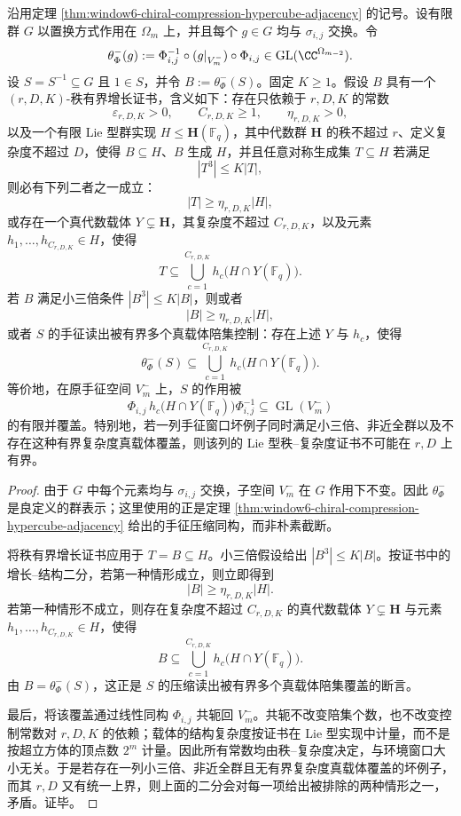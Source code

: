 \begin{theorem}[手征压缩窗口的秩有界坏例子分类门]\label{distill:breuillard_green_tao_approximate_groups_and_helfgott_growth-uniform_finite_to_geometric_transfer-chiral-compression-rank-bad-family-gate}
沿用定理 \ref{thm:window6-chiral-compression-hypercube-adjacency} 的记号。设有限群 \(G\) 以置换方式作用在 \(\Omega_m\) 上，并且每个 \(g\in G\) 均与 \(\sigma_{i,j}\) 交换。令
\[
\theta^-_{\Phi}(g):=\Phi_{i,j}^{-1}\circ (g|_{V_m^-})\circ \Phi_{i,j}
\in \operatorname{GL}(\CC^{\Omega_{m-2}}).
\]
设 \(S=S^{-1}\subseteq G\) 且 \(1\in S\)，并令 \(B:=\theta^-_{\Phi}(S)\)。固定 \(K\geq 1\)。假设 \(B\) 具有一个 \((r,D,K)\)-秩有界增长证书，含义如下：存在只依赖于 \(r,D,K\) 的常数
\[
\varepsilon_{r,D,K}>0,\qquad C_{r,D,K}\geq 1,\qquad \eta_{r,D,K}>0,
\]
以及一个有限 Lie 型群实现 \(H\leq \mathbf H(\mathbb F_q)\)，其中代数群 \(\mathbf H\) 的秩不超过 \(r\)、定义复杂度不超过 \(D\)，使得 \(B\subseteq H\)、\(B\) 生成 \(H\)，并且任意对称生成集 \(T\subseteq H\) 若满足
\[
|T^3|\leq K|T|,
\]
则必有下列二者之一成立：
\[
|T|\geq \eta_{r,D,K}|H|,
\]
或存在一个真代数载体 \(Y\subsetneq \mathbf H\)，其复杂度不超过 \(C_{r,D,K}\)，以及元素 \(h_1,\ldots,h_{C_{r,D,K}}\in H\)，使得
\[
T\subseteq \bigcup_{c=1}^{C_{r,D,K}}h_c\bigl(H\cap Y(\mathbb F_q)\bigr).
\]
若 \(B\) 满足小三倍条件 \( |B^3|\leq K|B| \)，则或者
\[
|B|\geq \eta_{r,D,K}|H|,
\]
或者 \(S\) 的手征读出被有界多个真载体陪集控制：存在上述 \(Y\) 与 \(h_c\)，使得
\[
\theta^-_{\Phi}(S)\subseteq
\bigcup_{c=1}^{C_{r,D,K}}h_c\bigl(H\cap Y(\mathbb F_q)\bigr).
\]
等价地，在原手征空间 \(V_m^-\) 上，\(S\) 的作用被
\[
\Phi_{i,j}\,h_c\bigl(H\cap Y(\mathbb F_q)\bigr)\Phi_{i,j}^{-1}
\subseteq \operatorname{GL}(V_m^-)
\]
的有限并覆盖。特别地，若一列手征窗口坏例子同时满足小三倍、非近全群以及不存在这种有界复杂度真载体覆盖，则该列的 Lie 型秩--复杂度证书不可能在 \(r,D\) 上有界。
\end{theorem}
\begin{proof}
由于 \(G\) 中每个元素均与 \(\sigma_{i,j}\) 交换，子空间 \(V_m^-\) 在 \(G\) 作用下不变。因此 \(\theta^-_{\Phi}\) 是良定义的群表示；这里使用的正是定理 \ref{thm:window6-chiral-compression-hypercube-adjacency} 给出的手征压缩同构，而非朴素截断。

将秩有界增长证书应用于 \(T=B\subseteq H\)。小三倍假设给出 \(|B^3|\leq K|B|\)。按证书中的增长--结构二分，若第一种情形成立，则立即得到
\[
|B|\geq \eta_{r,D,K}|H|.
\]
若第一种情形不成立，则存在复杂度不超过 \(C_{r,D,K}\) 的真代数载体 \(Y\subsetneq \mathbf H\) 与元素 \(h_1,\ldots,h_{C_{r,D,K}}\in H\)，使得
\[
B\subseteq \bigcup_{c=1}^{C_{r,D,K}}h_c\bigl(H\cap Y(\mathbb F_q)\bigr).
\]
由 \(B=\theta^-_{\Phi}(S)\)，这正是 \(S\) 的压缩读出被有界多个真载体陪集覆盖的断言。

最后，将该覆盖通过线性同构 \(\Phi_{i,j}\) 共轭回 \(V_m^-\)。共轭不改变陪集个数，也不改变控制常数对 \(r,D,K\) 的依赖；载体的结构复杂度按证书在 Lie 型实现中计量，而不是按超立方体的顶点数 \(2^m\) 计量。因此所有常数均由秩--复杂度决定，与环境窗口大小无关。于是若存在一列小三倍、非近全群且无有界复杂度真载体覆盖的坏例子，而其 \(r,D\) 又有统一上界，则上面的二分会对每一项给出被排除的两种情形之一，矛盾。证毕。
\end{proof}

